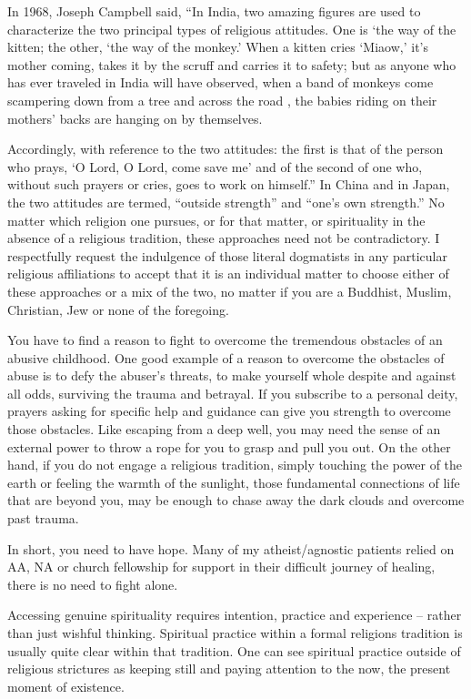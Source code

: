 \documentclass[]{book}
\begin{document}
In 1968, Joseph Campbell said, ``In India, two amazing figures are used to characterize the two principal types of religious attitudes. One is `the way of the kitten; the other, `the way of the monkey.' When a kitten cries `Miaow,' it's mother coming, takes it by the scruff and carries it to safety; but as anyone who has ever traveled in India will have observed, when a band of monkeys come scampering down from a tree and across the road , the babies riding on their mothers' backs are hanging on by themselves.

Accordingly, with reference to the two attitudes: the first is that of the person who prays, `O Lord, O Lord, come save me' and of the second of one who, without such prayers or cries, goes to work on himself.'' In China and in Japan, the two attitudes are termed, ``outside strength'' and ``one's own strength.'' No matter which religion one pursues, or for that matter, or spirituality in the absence of a religious tradition, these approaches need not be contradictory. I respectfully request the indulgence of those literal dogmatists in any particular religious affiliations to accept that it is an individual matter to choose either of these approaches or a mix of the two, no matter if you are a Buddhist, Muslim, Christian, Jew or none of the foregoing.

You have to find a reason to fight to overcome the tremendous obstacles of an abusive childhood. One good example of a reason to overcome the obstacles of abuse is to defy the abuser's threats, to make yourself whole despite and against all odds, surviving the trauma and betrayal. If you subscribe to a personal deity, prayers asking for specific help and guidance can give you strength to overcome those obstacles. Like escaping from a deep well, you may need the sense of an external power to throw a rope for you to grasp and pull you out. On the other hand, if you do not engage a religious tradition, simply touching the power of the earth or feeling the warmth of the sunlight, those fundamental connections of life that are beyond you, may be enough to chase away the dark clouds and overcome past trauma.

In short, you need to have hope. Many of my atheist/agnostic patients relied on AA, NA or church fellowship for support in their difficult journey of healing, there is no need to fight alone.

Accessing genuine spirituality requires intention, practice and experience -- rather than just wishful thinking. Spiritual practice within a formal religions tradition is usually quite clear within that tradition. One can see spiritual practice outside of religious strictures as keeping still and paying attention to the now, the present moment of existence.
\end{document}
